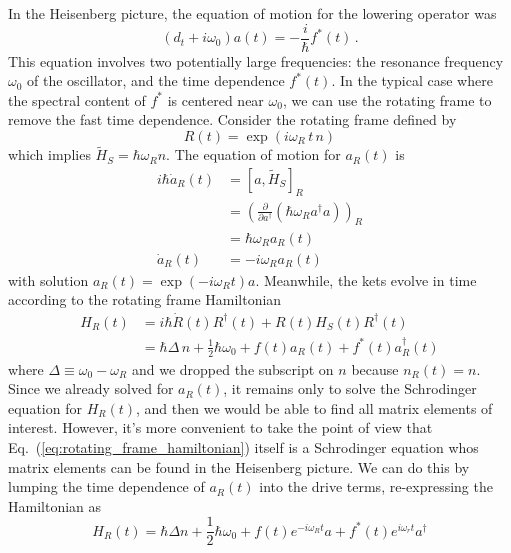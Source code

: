 In the Heisenberg picture, the equation of motion for the lowering operator was
\begin{equation*}
  \left( d_t + i \omega_0 \right) a(t) = -\frac{i}{\hbar} f^*(t)
  \, .
\end{equation*}
This equation involves two potentially large frequencies: the resonance frequency $\omega_0$ of the oscillator, and the time dependence $f^*(t)$.
In the typical case where the spectral content of $f^*$ is centered near $\omega_0$, we can use the rotating frame to remove the fast time dependence.
Consider the rotating frame defined by
\begin{equation*}
  R(t) = \exp(i \omega_R \, t \, n)
\end{equation*}
which implies $\tilde{H}_S = \hbar \omega_R n$.
The equation of motion for $a_R(t)$ is
\begin{align*}
  i \hbar \dot{a}_R(t)
  &= \left[ a, \tilde{H}_S \right]_R \\
  &= \left(
    \frac{\partial}{\partial a^\dagger} \left( \hbar \omega_R a^\dagger a \right)
    \right)_R \\
  &= \hbar \omega_R a_R(t) \\
  \dot{a}_R(t)
  &= -i \omega_R a_R(t)
\end{align*}
with solution $a_R(t) = \exp(-i \omega_R t) a$.
Meanwhile, the kets evolve in time according to the rotating frame Hamiltonian
\begin{align}
  H_R(t)
  &= i \hbar \dot{R}(t) R^\dagger(t) + R(t) H_S(t) R^\dagger(t) \nonumber \\
  &= \hbar \Delta \, n + \frac{1}{2} \hbar \omega_0 + f(t) a_R(t) + f^*(t) a_R^\dagger(t)
  \label{eq:rotating_frame_hamiltonian}  %
\end{align}
where $\Delta \equiv \omega_0 - \omega_R$ and we dropped the subscript on $n$ because $n_R(t) = n$.
Since we already solved for $a_R(t)$, it remains only to solve the Schrodinger equation for $H_R(t)$, and then we would be able to find all matrix elements of interest.
However, it's more convenient to take the point of view that Eq.~(\ref{eq:rotating_frame_hamiltonian}) itself is a Schrodinger equation whos matrix elements can be found in the Heisenberg picture.
We can do this by lumping the time dependence of $a_R(t)$ into the drive terms, re-expressing the Hamiltonian as
\begin{equation}
  H_R(t) = \hbar \Delta n + \frac{1}{2}\hbar \omega_0 + f(t)e^{-i \omega_R t} a + f^*(t) e^{i \omega_r t} a^\dagger
\end{equation}
